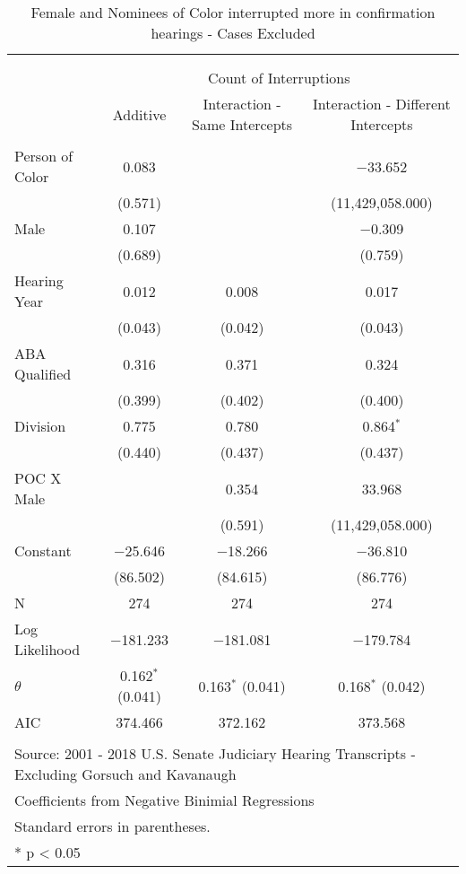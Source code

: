 
\begin{table}[!htbp] \centering 
  \caption{Female and Nominees of Color interrupted more in confirmation hearings - Cases Excluded} 
  \label{} 
\begin{tabular}{@{\extracolsep{5pt}}lccc} 
\\[-1.8ex]\hline \\[-1.8ex] 
\\[-1.8ex] & \multicolumn{3}{c}{Count of Interruptions} \\ 
 & Additive & Interaction - Same Intercepts & Interaction - Different Intercepts \\ 
\hline \\[-1.8ex] 
 Person of Color & 0.083 &  & $-$33.652 \\ 
  & (0.571) &  & (11,429,058.000) \\ 
  Male & 0.107 &  & $-$0.309 \\ 
  & (0.689) &  & (0.759) \\ 
  Hearing Year & 0.012 & 0.008 & 0.017 \\ 
  & (0.043) & (0.042) & (0.043) \\ 
  ABA Qualified & 0.316 & 0.371 & 0.324 \\ 
  & (0.399) & (0.402) & (0.400) \\ 
  Division & 0.775 & 0.780 & 0.864$^{*}$ \\ 
  & (0.440) & (0.437) & (0.437) \\ 
  POC X Male &  & 0.354 & 33.968 \\ 
  &  & (0.591) & (11,429,058.000) \\ 
  Constant & $-$25.646 & $-$18.266 & $-$36.810 \\ 
  & (86.502) & (84.615) & (86.776) \\ 
 N & 274 & 274 & 274 \\ 
Log Likelihood & $-$181.233 & $-$181.081 & $-$179.784 \\ 
$\theta$ & 0.162$^{*}$  (0.041) & 0.163$^{*}$  (0.041) & 0.168$^{*}$  (0.042) \\ 
AIC & 374.466 & 372.162 & 373.568 \\ 
\hline \\[-1.8ex] 
\multicolumn{4}{l}{Source: 2001 - 2018 U.S. Senate Judiciary Hearing Transcripts - Excluding Gorsuch and Kavanaugh} \\ 
\multicolumn{4}{l}{Coefficients from Negative Binimial Regressions} \\ 
\multicolumn{4}{l}{Standard errors in parentheses.} \\ 
\multicolumn{4}{l}{* p < 0.05} \\ 
\end{tabular} 
\end{table} 

